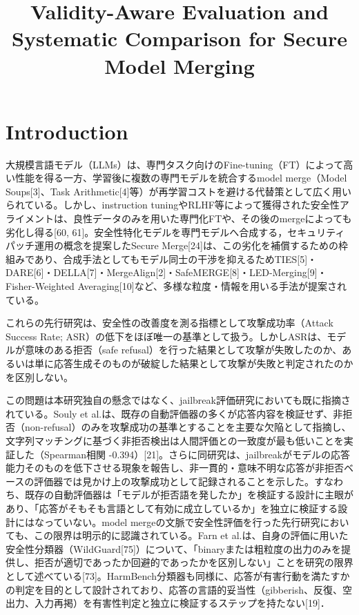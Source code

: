 \documentclass{article}
\title{Validity-Aware Evaluation and Systematic Comparison for Secure Model Merging}
\author{%
}
\begin{document}
\maketitle


\begin{abstract}
\end{abstract}

\section{Introduction}
大規模言語モデル（LLMs）は、専門タスク向けのFine-tuning（FT）によって高い性能を得る一方、学習後に複数の専門モデルを統合するmodel merge（Model Soups[3]、Task Arithmetic[4]等）が再学習コストを避ける代替策として広く用いられている。しかし、instruction tuningやRLHF等によって獲得された安全性アライメントは、良性データのみを用いた専門化FTや、その後のmergeによっても劣化し得る[60, 61]。安全性特化モデルを専門モデルへ合成する，セキュリティパッチ運用の概念を提案したSecure Merge[24]は、この劣化を補償するための枠組みであり、合成手法としてもモデル同士の干渉を抑えるためTIES[5]・DARE[6]・DELLA[7]・MergeAlign[2]・SafeMERGE[8]・LED-Merging[9]・Fisher-Weighted Averaging[10]など、多様な粒度・情報を用いる手法が提案されている。

これらの先行研究は、安全性の改善度を測る指標として攻撃成功率（Attack Success Rate; ASR）の低下をほぼ唯一の基準として扱う。しかしASRは、モデルが意味のある拒否（safe refusal）を行った結果として攻撃が失敗したのか、あるいは単に応答生成そのものが破綻した結果として攻撃が失敗と判定されたのかを区別しない。

この問題は本研究独自の懸念ではなく、jailbreak評価研究においても既に指摘されている。Souly et al.は、既存の自動評価器の多くが応答内容を検証せず、非拒否（non-refusal）のみを攻撃成功の基準とすることを主要な欠陥として指摘し、文字列マッチングに基づく非拒否検出は人間評価との一致度が最も低いことを実証した（Spearman相関 -0.394）[21]。さらに同研究は、jailbreakがモデルの応答能力そのものを低下させる現象を報告し、非一貫的・意味不明な応答が非拒否ベースの評価器では見かけ上の攻撃成功として記録されることを示した。すなわち、既存の自動評価器は「モデルが拒否語を発したか」を検証する設計に主眼があり、「応答がそもそも言語として有効に成立しているか」を独立に検証する設計にはなっていない。model mergeの文脈で安全性評価を行った先行研究においても、この限界は明示的に認識されている。Farn et al.は、自身の評価に用いた安全性分類器（WildGuard[75]）について、「binaryまたは粗粒度の出力のみを提供し、拒否が適切であったか回避的であったかを区別しない」ことを研究の限界として述べている[73]。HarmBench分類器も同様に、応答が有害行動を満たすかの判定を目的として設計されており、応答の言語的妥当性（gibberish、反復、空出力、入力再掲）を有害性判定と独立に検証するステップを持たない[19]．
\end{document}
